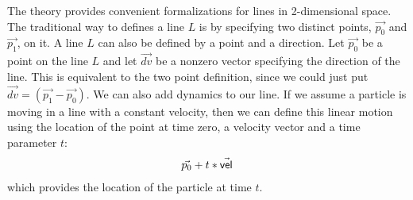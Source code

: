 \documentclass[12pt]{article}
\begin{document}
The theory  provides convenient formalizations for lines
in 2-dimensional space.  The traditional way to defines a line $L$ is
by specifying two distinct points, $\vec{p_0}$ and $\vec{p_1}$, on
it. A line $L$ can also be defined by a point and a direction.  Let
$\vec{p_0}$ be a point on the line $L$ and let $\vec{dv}$ be a nonzero
vector specifying the direction of the line.  This is equivalent to
the two point definition, since we could just put $\vec{dv} =
(\vec{p_1}-\vec{p_0})$.  We can also add dynamics to our line.  If we
assume a particle is moving in a line with a constant velocity, then
we can define this linear motion using the location of the point at
time zero, a velocity vector and a time parameter $t$:
\begin{eqnarray*}
      \vec{p_0} + t*\vec{{\sf vel}}
\end{eqnarray*}
which provides the location of the particle at time $t$.
\end{document}
